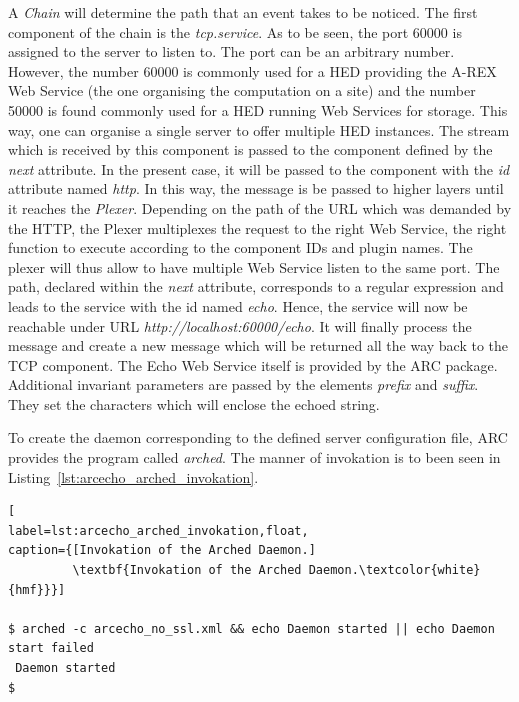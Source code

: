 %
%
%
A \textit{Chain} will determine the path that an event takes to be noticed.
The first component of the chain is the \textit{tcp.service}.
As to be seen, the port 60000 is assigned to the server to listen to.
The port can be an arbitrary number.
However, the number 60000 is commonly used for a HED providing the A-REX Web Service (the one organising the computation on a site) and the number 50000 is found commonly used for a HED running Web Services for storage.
This way, one can organise a single server to offer multiple HED instances.
The stream which is received by this component is passed to the component defined by the \textit{next} attribute.
In the present case, it will be passed to the component with the \textit{id} attribute named \textit{http}.
In this way, the message is be passed to higher layers until it reaches the \textit{Plexer}.
Depending on the path of the URL which was demanded by the HTTP, the Plexer multiplexes the request to the right Web Service, the right function to execute according to the component IDs and plugin names. The plexer will thus allow to have multiple Web Service listen to the same port.
The path, declared within the \textit{next} attribute, corresponds to a regular expression and leads to the service with the id named \textit{echo}. 
Hence, the service will now be reachable under URL \textit{http://localhost:60000/echo}.
It will finally process the message and create a new message which will be returned all the way back to the TCP component.
The Echo Web Service itself is provided by the ARC package.
Additional invariant parameters are passed by the elements \textit{prefix} and \textit{suffix}.
They set the characters which will enclose the echoed string.

To create the daemon corresponding to the defined server configuration file, ARC provides the program called \textit{arched}.
The manner of invokation is to been seen in Listing~\ref{lst:arcecho_arched_invokation}.
\begin{lstlisting}[
label=lst:arcecho_arched_invokation,float,
caption={[Invokation of the Arched Daemon.]
         \textbf{Invokation of the Arched Daemon.\textcolor{white}{hmf}}}]

$ arched -c arcecho_no_ssl.xml && echo Daemon started || echo Daemon start failed
 Daemon started
$
\end{lstlisting}

